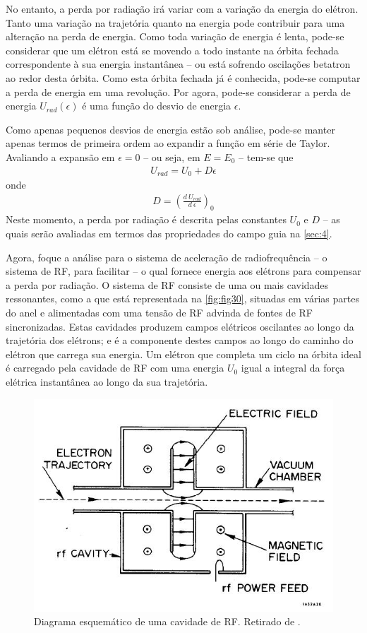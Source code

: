 No entanto, a perda por radiação irá variar com a variação da energia do elétron. Tanto uma variação na trajetória quanto na energia pode contribuir para uma alteração na perda de energia. Como toda variação de energia é lenta, pode-se considerar que um elétron está se movendo a todo instante na órbita fechada correspondente à sua energia instantânea -- ou está sofrendo oscilações betatron ao redor desta órbita. Como esta órbita fechada já é conhecida, pode-se computar a perda de energia em uma revolução. Por agora, pode-se considerar a perda de energia $U_{rad}(\epsilon)$ é uma função do desvio de energia $\epsilon$.

Como apenas pequenos desvios de energia estão sob análise, pode-se manter apenas termos de primeira ordem ao expandir a função em série de Taylor. Avaliando a expansão em $\epsilon=0$ -- ou seja, em $E=E_0$ -- tem-se que
\begin{align}
	U_{rad} = U_0 + D\epsilon\label{eq:3.23}
\end{align}
onde
\begin{align}
	D = \left(\frac{d\ U_{rad}}{d\ \epsilon}\right)_0\label{eq:3.24}
\end{align}
Neste momento, a perda por radiação é descrita pelas constantes $U_0$ e $D$ -- as quais serão avaliadas em termos das propriedades do campo guia na \autoref{sec:4}.

Agora, foque a análise para o sistema de aceleração de radiofrequência -- o sistema de RF, para facilitar -- o qual fornece energia aos elétrons para compensar a perda por radiação. O sistema de RF consiste de uma ou mais cavidades ressonantes, como a que está representada na \autoref{fig:fig30}, situadas em várias partes do anel e alimentadas com uma tensão de RF advinda de fontes de RF sincronizadas. Estas cavidades produzem campos elétricos oscilantes ao longo da trajetória dos elétrons; e é a componente destes campos ao longo do caminho do elétron que carrega sua energia. Um elétron que completa um ciclo na órbita ideal é carregado pela cavidade de RF com uma energia $U_0$ igual a integral da força elétrica instantânea ao longo da sua trajetória.

\begin{figure}[!htb]
	\centering
	\includegraphics[width=0.7\linewidth]{./Figuras/fig30.jpeg}
	\caption{Diagrama esquemático de uma cavidade de RF. Retirado de \cite{sands1970physics}.}
	\label{fig:fig30}
\end{figure}

